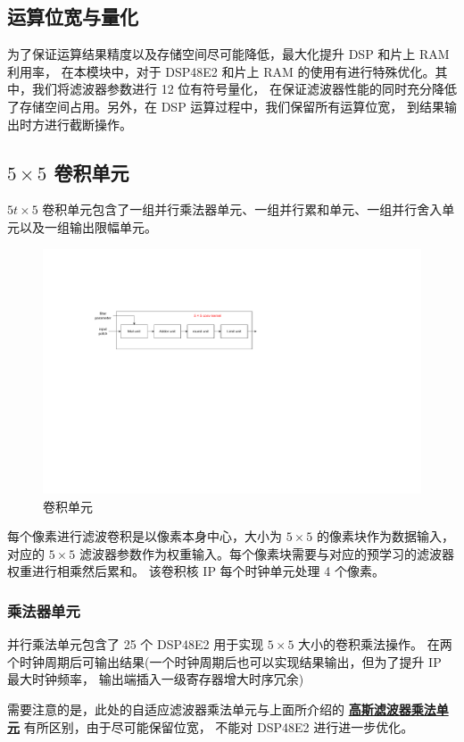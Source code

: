 \documentclass[12pt, a4paper, oneside]{ctexbook}
\begin{document}
	\subsection{运算位宽与量化}
	为了保证运算结果精度以及存储空间尽可能降低，最大化提升 DSP 和片上 RAM 利用率，
	在本模块中，对于 DSP48E2 和片上 RAM 的使用有进行特殊优化。其中，我们将滤波器参数进行 12 位有符号量化，
	在保证滤波器性能的同时充分降低了存储空间占用。另外，在 DSP 运算过程中，我们保留所有运算位宽，
	到结果输出时方进行截断操作。
	\subsection{$5\times5$ 卷积单元}
	$5t\times5$ 卷积单元包含了一组并行乘法器单元、一组并行累和单元、一组并行舍入单元以及一组输出限幅单元。
		\begin{figure}[h]
		\centering
		\includegraphics[scale=0.7]{pic/conv.pdf}
		\caption{卷积单元}
		\end{figure}	
	每个像素进行滤波卷积是以像素本身中心，大小为 $5\times5$ 的像素块作为数据输入，
	对应的 $5\times5$ 滤波器参数作为权重输入。每个像素块需要与对应的预学习的滤波器权重进行相乘然后累和。
	该卷积核 IP 每个时钟单元处理 4 个像素。
	\subsubsection{乘法器单元}
	并行乘法单元包含了 25 个 DSP48E2 用于实现 $5\times5$ 大小的卷积乘法操作。
	在两个时钟周期后可输出结果(一个时钟周期后也可以实现结果输出，但为了提升 IP 最大时钟频率，
	输出端插入一级寄存器增大时序冗余) \par 需要注意的是，此处的自适应滤波器乘法单元与上面所介绍的 
	\hyperref[mul_unit]{\textbf{高斯滤波器乘法单元}} 有所区别，由于尽可能保留位宽，
	不能对 DSP48E2 进行进一步优化。%
\end{document}
